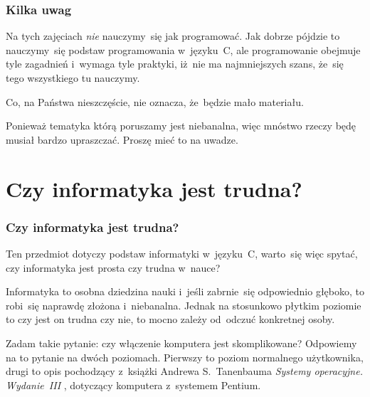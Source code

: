 \documentclass[10pt,t]{beamer}
\begin{document}
\begin{frame}
  \frametitle{Kilka uwag}


  Na tych zajęciach \textit{nie} nauczymy~się jak programować. Jak dobrze
  pójdzie to nauczymy~się podstaw programowania w~języku~C, ale
  programowanie obejmuje tyle zagadnień i~wymaga tyle praktyki, iż~nie
  ma najmniejszych szans, że~się tego wszystkiego tu nauczymy.

  Co, na Państwa nieszczęście, nie oznacza, że~będzie mało materiału.

  Ponieważ tematyka którą poruszamy jest niebanalna, więc mnóstwo rzeczy
  będę musiał bardzo upraszczać. Proszę mieć to na uwadze.

\end{frame}










\section{Czy informatyka jest trudna?}



\begin{frame}
  \frametitle{Czy informatyka jest trudna?}


  Ten przedmiot dotyczy podstaw informatyki w~języku~C, warto~się
  więc spytać, czy informatyka jest prosta czy trudna w~nauce?

  Informatyka to osobna dziedzina nauki i~jeśli zabrnie~się odpowiednio
  głęboko, to robi~się naprawdę złożona i~niebanalna. Jednak na stosunkowo
  płytkim poziomie to czy jest on trudna czy nie, to mocno zależy od~odczuć
  konkretnej osoby.

  Zadam takie pytanie: czy włączenie komputera jest skomplikowane?
  Odpowiemy na to pytanie na dwóch poziomach. Pierwszy to poziom normalnego
  użytkownika, drugi to opis pochodzący z~książki Andrewa S.~Tanenbauma
  \textit{Systemy operacyjne. Wydanie~III}
  \parencite{Tannenbaum-Systemy-Operacyjne-Wydanie-III-Pub-2013}, dotyczący
  komputera z~systemem Pentium.

\end{frame}
\end{document}
